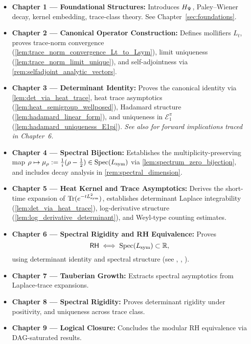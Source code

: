 \begin{itemize}
  \item \textbf{Chapter 1 — Foundational Structures:}  
  Introduces \( H_{\Psi} \), Paley–Wiener decay, kernel embedding, trace-class theory. See Chapter~\ref{sec:foundations}.

  \item \textbf{Chapter 2 — Canonical Operator Construction:}  
  Defines mollifiers \( L_t \), proves trace-norm convergence (\cref{lem:trace_norm_convergence_Lt_to_Lsym}), limit uniqueness (\cref{lem:trace_norm_limit_unique}), and self-adjointness via \cref{rem:selfadjoint_analytic_vectors}.

  \item \textbf{Chapter 3 — Determinant Identity:}  
  Proves the canonical identity via \cref{lem:det_via_heat_trace}, heat trace asymptotics (\cref{lem:heat_semigroup_wellposed}), Hadamard structure (\cref{lem:hadamard_linear_form}), and uniqueness in \( \mathcal{E}_1^\pi \) (\cref{lem:hadamard_uniqueness_E1pi}).  
  \textit{See also  for forward implications traced in Chapter~6.}

  \item \textbf{Chapter 4 — Spectral Bijection:}  
  Establishes the multiplicity-preserving map \( \rho \mapsto \mu_\rho := \tfrac{1}{i}(\rho - \tfrac{1}{2}) \in \operatorname{Spec}(L_{\mathrm{sym}}) \) via \cref{lem:spectrum_zero_bijection}, and includes decay analysis in \cref{rem:spectral_dimension}.

  \item \textbf{Chapter 5 — Heat Kernel and Trace Asymptotics:}  
  Derives the short-time expansion of \( \operatorname{Tr}(e^{-tL_{\mathrm{sym}}^2}) \), establishes determinant Laplace integrability (\cref{lem:det_via_heat_trace}), log-derivative structure (\cref{lem:log_derivative_determinant}), and Weyl-type counting estimates.

  \item \textbf{Chapter 6 — Spectral Rigidity and RH Equivalence:}  
  Proves
  \[
  \mathsf{RH} \iff \operatorname{Spec}(L_{\mathrm{sym}}) \subset \mathbb{R},
  \]
  using determinant identity and spectral structure (see , , ).

  \item \textbf{Chapter 7 — Tauberian Growth:}  
  Extracts spectral asymptotics from Laplace-trace expansions.

  \item \textbf{Chapter 8 — Spectral Rigidity:}  
  Proves determinant rigidity under positivity, and uniqueness across trace class.

  \item \textbf{Chapter 9 — Logical Closure:}  
  Concludes the modular RH equivalence via DAG-saturated results.
\end{itemize}

